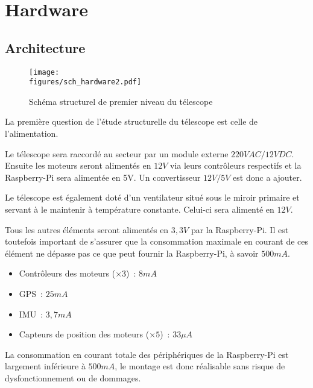 \chapter{Hardware}


\section{Architecture}

\begin{figure}[H]
    \centering
    \texttt{[image: \\figures/sch\_hardware2.pdf]}
    \decoRule
    \caption[
    Schéma structurel de premier niveau du télescope]{
    Schéma structurel de premier niveau du télescope}
    \label{fig:Schéma structurel de premier niveau du télescope}
    \end{figure}

\vspace{1cm}

La première question de l'étude structurelle du télescope est celle de l'alimentation.

Le télescope sera raccordé au secteur par un module externe $220VAC / 12VDC$. Ensuite les moteurs seront alimentés en $12V$ via leurs contrôleurs respectifs et la Raspberry-Pi sera alimentée en 5V. Un convertisseur $12V / 5V$ est donc a ajouter.

Le télescope est également doté d'un ventilateur situé sous le miroir primaire et servant à le maintenir à température constante. Celui-ci sera alimenté en $12V$.

\vspace{1cm}

Tous les autres éléments seront alimentés en $3,3V$ par la Raspberry-Pi. Il est toutefois important de s'assurer que la consommation maximale en courant de ces élément ne dépasse pas ce que peut fournir la Raspberry-Pi, à savoir $500mA$.
\begin{itemize}[label=$\bullet$]
	\item Contrôleurs des moteurs ($\times 3$)~: $8mA$
	\item GPS~: $25mA$
	\item IMU~: $3,7mA$
	\item Capteurs de position des moteurs ($\times 5$)~: $33\mu A$
	\end{itemize}

\vspace{1cm}

La consommation en courant totale des périphériques de la Raspberry-Pi est largement inférieure à $500mA$, le montage est donc réalisable sans risque de dysfonctionnement ou de dommages.

